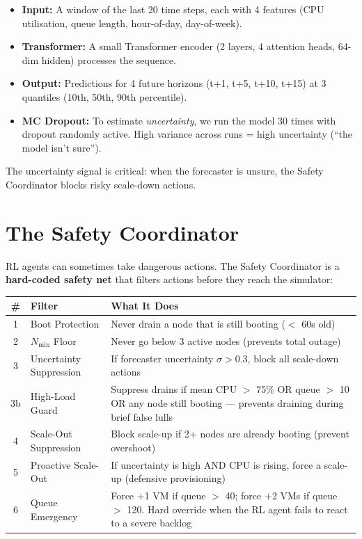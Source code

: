 \documentclass[11pt,a4paper]{article}
\begin{document}
\begin{itemize}[leftmargin=2em]
  \item \textbf{Input:} A window of the last 20 time steps, each with 4
        features (CPU utilisation, queue length, hour-of-day, day-of-week).
  \item \textbf{Transformer:} A small Transformer encoder (2 layers, 4 attention
        heads, 64-dim hidden) processes the sequence.
  \item \textbf{Output:} Predictions for 4 future horizons (t+1, t+5, t+10,
        t+15) at 3 quantiles (10th, 50th, 90th percentile).
  \item \textbf{MC Dropout:} To estimate \textit{uncertainty}, we run the model
        30 times with dropout randomly active. High variance across runs =
        high uncertainty (``the model isn't sure'').
\end{itemize}

The uncertainty signal is critical: when the forecaster is unsure, the Safety
Coordinator blocks risky scale-down actions.


\section{The Safety Coordinator}\label{sec:coordinator}


RL agents can sometimes take dangerous actions. The Safety Coordinator is a
\textbf{hard-coded safety net} that filters actions before they reach the
simulator:

\begin{center}
\begin{tabular}{clp{7cm}}
\toprule
\textbf{\#} & \textbf{Filter} & \textbf{What It Does} \\
\midrule
1 & Boot Protection & Never drain a node that is still booting ($<$ 60s old) \\
2 & $N_{\min}$ Floor & Never go below 3 active nodes (prevents total outage) \\
3 & Uncertainty Suppression & If forecaster uncertainty $\sigma > 0.3$, block all
    scale-down actions \\
3b & High-Load Guard & Suppress drains if mean CPU $>$ 75\% OR queue $>$ 10 OR any
    node still booting --- prevents draining during brief false lulls \\
4 & Scale-Out Suppression & Block scale-up if 2+ nodes are already booting
    (prevent overshoot) \\
5 & Proactive Scale-Out & If uncertainty is high AND CPU is rising, force a
    scale-up (defensive provisioning) \\
6 & Queue Emergency & Force $+$1 VM if queue $>$ 40; force $+$2 VMs if queue $>$ 120.
    Hard override when the RL agent fails to react to a severe backlog \\
\bottomrule
\end{tabular}
\end{center}
\end{document}
